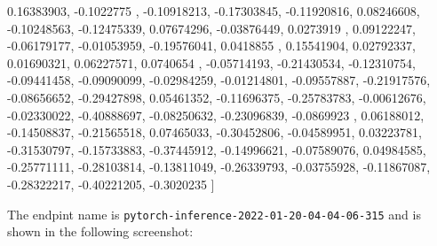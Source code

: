 \documentclass[a4paper
]{article}
\newenvironment{Shaded}{}{}
\newcommand{\FloatTok}[1]{\textcolor[rgb]{0.25,0.63,0.44}{#1}}
\newcommand{\OtherTok}[1]{\textcolor[rgb]{0.00,0.44,0.13}{#1}}
\begin{document}
\begin{Shaded}
\begin{Highlighting}[]
        \FloatTok{0.16383903}\OtherTok{,} \FloatTok{{-}0.1022775} \OtherTok{,} \FloatTok{{-}0.10918213}\OtherTok{,} \FloatTok{{-}0.17303845}\OtherTok{,} \FloatTok{{-}0.11920816}\OtherTok{,}
        \FloatTok{0.08246608}\OtherTok{,} \FloatTok{{-}0.10248563}\OtherTok{,} \FloatTok{{-}0.12475339}\OtherTok{,}  \FloatTok{0.07674296}\OtherTok{,} \FloatTok{{-}0.03876449}\OtherTok{,}
        \FloatTok{0.0273919} \OtherTok{,}  \FloatTok{0.09122247}\OtherTok{,} \FloatTok{{-}0.06179177}\OtherTok{,} \FloatTok{{-}0.01053959}\OtherTok{,} \FloatTok{{-}0.19576041}\OtherTok{,}
        \FloatTok{0.0418855} \OtherTok{,}  \FloatTok{0.15541904}\OtherTok{,}  \FloatTok{0.02792337}\OtherTok{,}  \FloatTok{0.01690321}\OtherTok{,}  \FloatTok{0.06227571}\OtherTok{,}
        \FloatTok{0.0740654} \OtherTok{,} \FloatTok{{-}0.05714193}\OtherTok{,} \FloatTok{{-}0.21430534}\OtherTok{,} \FloatTok{{-}0.12310754}\OtherTok{,} \FloatTok{{-}0.09441458}\OtherTok{,}
       \FloatTok{{-}0.09090099}\OtherTok{,} \FloatTok{{-}0.02984259}\OtherTok{,} \FloatTok{{-}0.01214801}\OtherTok{,} \FloatTok{{-}0.09557887}\OtherTok{,} \FloatTok{{-}0.21917576}\OtherTok{,}
       \FloatTok{{-}0.08656652}\OtherTok{,} \FloatTok{{-}0.29427898}\OtherTok{,}  \FloatTok{0.05461352}\OtherTok{,} \FloatTok{{-}0.11696375}\OtherTok{,} \FloatTok{{-}0.25783783}\OtherTok{,}
       \FloatTok{{-}0.00612676}\OtherTok{,} \FloatTok{{-}0.02330022}\OtherTok{,} \FloatTok{{-}0.40888697}\OtherTok{,} \FloatTok{{-}0.08250632}\OtherTok{,} \FloatTok{{-}0.23096839}\OtherTok{,}
       \FloatTok{{-}0.0869923} \OtherTok{,}  \FloatTok{0.06188012}\OtherTok{,} \FloatTok{{-}0.14508837}\OtherTok{,} \FloatTok{{-}0.21565518}\OtherTok{,}  \FloatTok{0.07465033}\OtherTok{,}
       \FloatTok{{-}0.30452806}\OtherTok{,} \FloatTok{{-}0.04589951}\OtherTok{,}  \FloatTok{0.03223781}\OtherTok{,} \FloatTok{{-}0.31530797}\OtherTok{,} \FloatTok{{-}0.15733883}\OtherTok{,}
       \FloatTok{{-}0.37445912}\OtherTok{,} \FloatTok{{-}0.14996621}\OtherTok{,} \FloatTok{{-}0.07589076}\OtherTok{,}  \FloatTok{0.04984585}\OtherTok{,} \FloatTok{{-}0.25771111}\OtherTok{,}
       \FloatTok{{-}0.28103814}\OtherTok{,} \FloatTok{{-}0.13811049}\OtherTok{,} \FloatTok{{-}0.26339793}\OtherTok{,} \FloatTok{{-}0.03755928}\OtherTok{,} \FloatTok{{-}0.11867087}\OtherTok{,}
       \FloatTok{{-}0.28322217}\OtherTok{,} \FloatTok{{-}0.40221205}\OtherTok{,} \FloatTok{{-}0.3020235} \OtherTok{]}
\end{Highlighting}
\end{Shaded}

\newpage
The endpint name is
\texttt{\textquotesingle{}pytorch-inference-2022-01-20-04-04-06-315\textquotesingle{}}
and is shown in the following screenshot:
\end{document}
